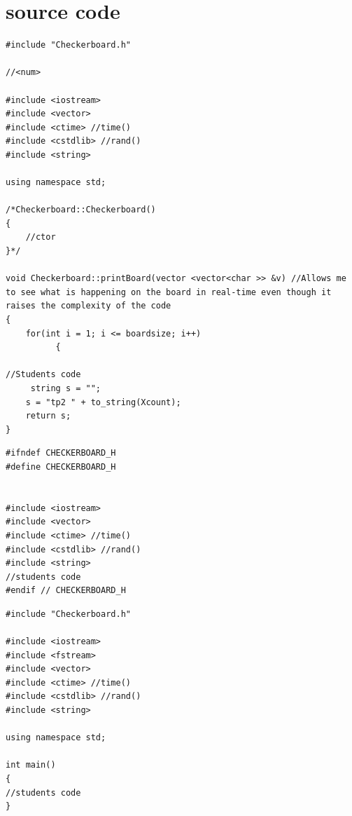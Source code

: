 \documentclass[9pt]{article}%
\begin{document}
\section*{source code}

\begin{lstlisting}[caption=Checkerboard.cpp,style=cmdoutput]
#include "Checkerboard.h"

//<num>

#include <iostream>
#include <vector>
#include <ctime> //time()
#include <cstdlib> //rand()
#include <string>

using namespace std;

/*Checkerboard::Checkerboard()
{
    //ctor
}*/

void Checkerboard::printBoard(vector <vector<char >> &v) //Allows me to see what is happening on the board in real-time even though it  raises the complexity of the code
{
    for(int i = 1; i <= boardsize; i++)
          {

//Students code
     string s = "";
    s = "tp2 " + to_string(Xcount);
    return s;
}

\end{lstlisting}

\begin{lstlisting}[caption=Checkerboard.h,style=cmdoutput]
#ifndef CHECKERBOARD_H
#define CHECKERBOARD_H


#include <iostream>
#include <vector>
#include <ctime> //time()
#include <cstdlib> //rand()
#include <string>
//students code
#endif // CHECKERBOARD_H
\end{lstlisting}

\begin{lstlisting}[caption=main.cpp,style=cmdoutput]
#include "Checkerboard.h"

#include <iostream>
#include <fstream>
#include <vector>
#include <ctime> //time()
#include <cstdlib> //rand()
#include <string>

using namespace std;

int main()
{
//students code
}
\end{lstlisting}
\end{document}
